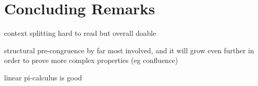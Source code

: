 \section{Concluding Remarks}
\label{sec:conclusion}

context splitting hard to read but overall doable

structural pre-congruence by far most involved, and it will grow even further in
order to prove more complex properties (eg confluence)

linear pi-calculus is good
